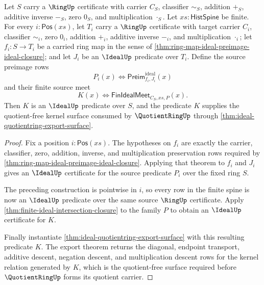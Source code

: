 \begin{theorem}
\label{thm:ideal-finite-preimage-meet-quotient-kernel-export}
Let $S$ carry a $\RingUp$ certificate with carrier $C_S$, classifier $\sim_S$, addition $+_S$, additive inverse $-_S$, zero $0_S$, and multiplication $\cdot_S$. Let $xs:\mathsf{HistSpine}$ be finite. For every $i:\mathsf{Pos}(xs)$, let $T_i$ carry a $\RingUp$ certificate with target carrier $C_i$, classifier $\sim_i$, zero $0_i$, addition $+_i$, additive inverse $-_i$, and multiplication $\cdot_i$; let $f_i:S\to T_i$ be a carried ring map in the sense of \autoref{thm:ring-map-ideal-preimage-ideal-closure}; and let $J_i$ be an $\IdealUp$ predicate over $T_i$. Define the source preimage rows
$$
P_i(x)\Longleftrightarrow \mathsf{Preim}^{\mathrm{ideal}}_{f_i,J_i}(x)
$$
and their finite source meet
$$
K(x)\Longleftrightarrow \mathsf{FinIdealMeet}_{C_S,xs,P}(x).
$$
Then $K$ is an $\IdealUp$ predicate over $S$, and the predicate $K$ supplies the quotient-free kernel surface consumed by $\QuotientRingUp$ through \autoref{thm:ideal-quotientring-export-surface}.
\end{theorem}
\begin{proof}
Fix a position $i:\mathsf{Pos}(xs)$. The hypotheses on $f_i$ are exactly the carrier, classifier, zero, addition, inverse, and multiplication preservation rows required by \autoref{thm:ring-map-ideal-preimage-ideal-closure}. Applying that theorem to $f_i$ and $J_i$ gives an $\IdealUp$ certificate for the source predicate $P_i$ over the fixed ring $S$.

The preceding construction is pointwise in $i$, so every row in the finite spine is now an $\IdealUp$ predicate over the same source $\RingUp$ certificate. Apply \autoref{thm:finite-ideal-intersection-closure} to the family $P$ to obtain an $\IdealUp$ certificate for $K$.

Finally instantiate \autoref{thm:ideal-quotientring-export-surface} with this resulting predicate $K$. The export theorem returns the diagonal, endpoint transport, additive descent, negation descent, and multiplication descent rows for the kernel relation generated by $K$, which is the quotient-free surface required before $\QuotientRingUp$ forms its quotient carrier.
\end{proof}

